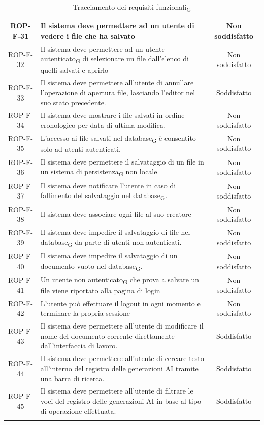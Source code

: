 \documentclass[11pt,a4paper]{article}
\newcommand{\gls}[1]{#1\textsubscript{G}}
\begin{document}
\begin{longtable}{|c|p{11cm}|c|}
\hline
ROP-F-31 & Il sistema deve permettere ad un utente di vedere i file che ha salvato & Non soddisfatto \\
\hline
ROP-F-32 & Il sistema deve permettere ad un \gls{utente autenticato} di selezionare un file dall'elenco di quelli salvati e aprirlo & Non soddisfatto \\
\hline
ROP-F-33 & Il sistema deve permettere all'utente di annullare l'operazione di apertura file, lasciando l'editor nel suo stato precedente. & Soddisfatto \\
\hline
ROP-F-34 & Il sistema deve mostrare i file salvati in ordine cronologico per data di ultima modifica. & Non soddisfatto \\
\hline
ROP-F-35 & L'accesso ai file salvati nel \gls{database} è consentito solo ad utenti autenticati. & Non soddisfatto \\
\hline
ROP-F-36 & Il sistema deve permettere il salvataggio di un file in un \gls{sistema di persistenza} non locale & Non soddisfatto \\
\hline
ROP-F-37 & Il sistema deve notificare l'utente in caso di fallimento del salvataggio nel \gls{database}. & Non soddisfatto \\
\hline
ROP-F-38 & Il sistema deve associare ogni file al suo creatore & Non soddisfatto \\
\hline
ROP-F-39 & Il sistema deve impedire il salvataggio di file nel \gls{database} da parte di utenti non autenticati. & Non soddisfatto \\
\hline
ROP-F-40 & Il sistema deve impedire il salvataggio di un documento vuoto nel \gls{database}. & Non soddisfatto \\
\hline
ROP-F-41 & Un \gls{utente non autenticato} che prova a salvare un file viene riportato alla pagina di login & Non soddisfatto \\
\hline
ROP-F-42 & L'utente può effettuare il logout in ogni momento e terminare la propria sessione & Non soddisfatto \\
\hline
ROP-F-43 & Il sistema deve permettere all'utente di modificare il nome del documento corrente direttamente dall'interfaccia di lavoro. & Soddisfatto \\
\hline
ROP-F-44 & Il sistema deve permettere all'utente di cercare testo all'interno del registro delle generazioni AI tramite una barra di ricerca. & Soddisfatto\\
\hline
ROP-F-45 & Il sistema deve permettere all'utente di filtrare le voci del registro delle generazioni AI in base al tipo di operazione effettuata. & Soddisfatto\\
\hline
\addlinespace[1em]
\caption{Tracciamento dei \gls{requisiti funzionali}}
\label{tab:tracciamento_requisiti_funzionali}
\end{longtable}
\end{document}
